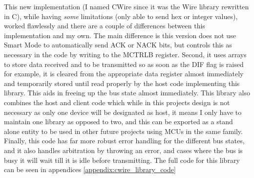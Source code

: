 \documentclass[11pt,a4paper,titlepage]{report}
\begin{document}
	  This new implementation (I named CWire since it was the Wire library rewritten in C), while having \textit{some} limitations (only able to send hex or integer values), worked flawlessly and there are a couple of differences between this implementation and my own. The main difference is this version does not use Smart Mode to automatically send ACK or NACK bits, but controls this as necessary in the code by writing to the MCTRLB register. Second, it uses arrays to store data received and to be transmitted so as soon as the DIF flag is raised for example, it is cleared from the appropriate data register almost immediately and temporarily stored until read properly by the host code implementing this library. This aids in freeing up the bus state almost immediately. This library also combines the host and client code which while in this projects design is not necessary as only one device will be designated as host, it means I only have to maintain one library as opposed to two, and this can be exported as a stand alone entity to be used in other future projects using MCUs in the same family. Finally, this code has far more robust error handling for the different bus states, and it also handles arbitration by throwing an error, and cases where the bus is busy it will wait till it is idle before transmitting. The full code for this library can be seen in appendices \ref{appendix:cwire_library_code}
	
\end{document}
